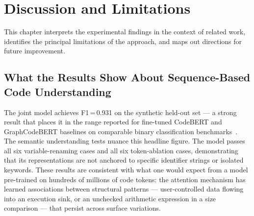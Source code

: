 \chapter{Discussion and Limitations}
\label{ch:discussion}

This chapter interprets the experimental findings in the context of related work,
identifies the principal limitations of the approach, and maps out directions for
future improvement.

\section{What the Results Show About Sequence-Based Code Understanding}

The joint model achieves F1\,=\,0.931 on the synthetic held-out set --- a strong result
that places it in the range reported for fine-tuned CodeBERT and GraphCodeBERT baselines
on comparable binary classification benchmarks~\cite{fu2022linevul,ni2023diversevul}.
The semantic understanding tests nuance this headline figure.
The model passes all six variable-renaming cases and all six token-ablation cases,
demonstrating that its representations are not anchored to specific identifier strings
or isolated keywords.
These results are consistent with what one would expect from a model pre-trained on
hundreds of millions of code tokens: the attention mechanism has learned associations
between structural patterns --- user-controlled data flowing into an execution sink,
or an unchecked arithmetic expression in a size comparison --- that persist across
surface variations.

